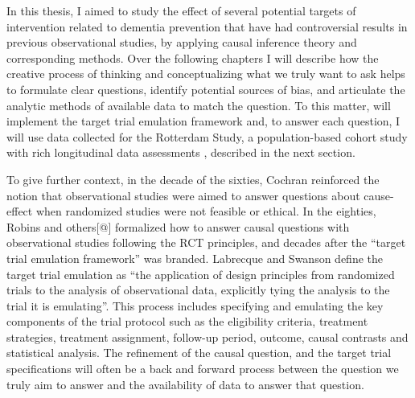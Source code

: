 \documentclass[
]{book}
\begin{document}
In this thesis, I aimed to study the effect of several potential targets of intervention related to dementia prevention that have had controversial results in previous observational studies, by applying causal inference theory and corresponding methods. Over the following chapters I will describe how the creative process of thinking and conceptualizing what we truly want to ask helps to formulate clear questions, identify potential sources of bias, and articulate the analytic methods of available data to match the question. To this matter, will implement the target trial emulation framework \autocite{hernan_robins_2016,labrecque2018} and, to answer each question, I will use data collected for the Rotterdam Study, a population-based cohort study with rich longitudinal data assessments \autocite{ikram2020}, described in the next section.

To give further context, in the decade of the sixties, Cochran reinforced the notion that observational studies were aimed to answer questions about cause-effect when randomized studies were not feasible or ethical\autocite{cochran1965}. In the eighties, Robins and others{[}@{]} formalized how to answer causal questions with observational studies following the RCT principles, and decades after the ``target trial emulation framework'' was branded\autocite{hernan_robins_2016}. Labrecque and Swanson define the target trial emulation as ``the application of design principles from randomized trials to the analysis of observational data, explicitly tying the analysis to the trial it is emulating''\autocite{labrecque2018}. This process includes specifying and emulating the key components of the trial protocol such as the eligibility criteria, treatment strategies, treatment assignment, follow-up period, outcome, causal contrasts and statistical analysis. The refinement of the causal question, and the target trial specifications will often be a back and forward process between the question we truly aim to answer and the availability of data to answer that question\autocite{labrecque2018,whatif2020}.
\end{document}
